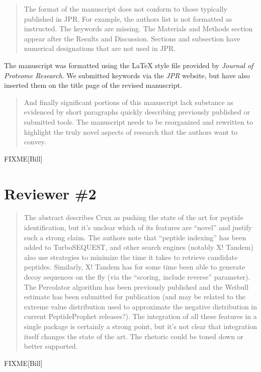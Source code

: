 \documentclass{article}
\newcommand{\breview}{\begin{quotation}\begin{em}\noindent}
\newcommand{\ereview}{\end{em}\end{quotation}}
\begin{document}
\breview The format of the manuscript does not conform to those
typically published in JPR.  For example, the authors list is not
formatted as instructed.  The keywords are missing.  The Materials and
Methods section appear after the Results and Discussion.  Sections and
subsection have numerical designations that are not used in
JPR. \ereview

The manuscript was formatted using the LaTeX style file provided by
{\em Journal of Proteome Research}.  We submitted keywords via the
{\em JPR} website, but have also inserted them on the title page of
the revised manuscript.

\breview And finally significant portions of this manuscript lack
substance as evidenced by short paragraphs quickly describing
previously published or submitted tools.  The manuscript needs to be
reorganized and rewritten to highlight the truly novel aspects of
research that the authors want to convey. \ereview

FIXME[Bill]

\section*{Reviewer \#2}

\breview The abstract describes Crux as pushing the state of the art
for peptide identification, but it's unclear which of its features are
``novel'' and justify such a strong claim. The authors note that
``peptide indexing'' has been added to TurboSEQUEST, and other search
engines (notably X! Tandem) also use strategies to minimize the time
it takes to retrieve candidate peptides. Similarly, X! Tandem has for
some time been able to generate decoy sequences on the fly (via the
``scoring, include reverse'' parameter). The Percolator algorithm has
been previously published and the Weibull estimate has been submitted
for publication (and may be related to the extreme value distribution
used to approximate the negative distribution in current
PeptideProphet releases?). The integration of all these features in a
single package is certainly a strong point, but it's not clear that
integration itself changes the state of the art. The rhetoric could be
toned down or better supported. \ereview

FIXME[Bill]
\end{document}
